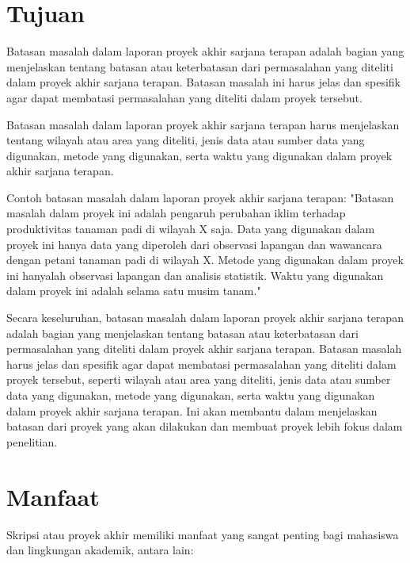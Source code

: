\section{Tujuan}
Batasan masalah dalam laporan proyek akhir sarjana terapan adalah bagian yang menjelaskan tentang batasan atau keterbatasan dari permasalahan yang diteliti dalam proyek akhir sarjana terapan. Batasan masalah ini harus jelas dan spesifik agar dapat membatasi permasalahan yang diteliti dalam proyek tersebut.

Batasan masalah dalam laporan proyek akhir sarjana terapan harus menjelaskan tentang wilayah atau area yang diteliti, jenis data atau sumber data yang digunakan, metode yang digunakan, serta waktu yang digunakan dalam proyek akhir sarjana terapan.

Contoh batasan masalah dalam laporan proyek akhir sarjana terapan:
"Batasan masalah dalam proyek ini adalah pengaruh perubahan iklim terhadap produktivitas tanaman padi di wilayah X saja. Data yang digunakan dalam proyek ini hanya data yang diperoleh dari observasi lapangan dan wawancara dengan petani tanaman padi di wilayah X. Metode yang digunakan dalam proyek ini hanyalah observasi lapangan dan analisis statistik. Waktu yang digunakan dalam proyek ini adalah selama satu musim tanam."

Secara keseluruhan, batasan masalah dalam laporan proyek akhir sarjana terapan adalah bagian yang menjelaskan tentang batasan atau keterbatasan dari permasalahan yang diteliti dalam proyek akhir sarjana terapan. Batasan masalah harus jelas dan spesifik agar dapat membatasi permasalahan yang diteliti dalam proyek tersebut, seperti wilayah atau area yang diteliti, jenis data atau sumber data yang digunakan, metode yang digunakan, serta waktu yang digunakan dalam proyek akhir sarjana terapan. Ini akan membantu dalam menjelaskan batasan dari proyek yang akan dilakukan dan membuat proyek lebih fokus dalam penelitian.

\section{Manfaat}
Skripsi atau proyek akhir memiliki manfaat yang sangat penting bagi mahasiswa dan lingkungan akademik, antara lain:


